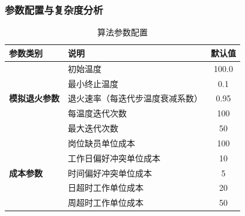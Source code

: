 \subsubsection{参数配置与复杂度分析}
\begin{table}[H]
    \centering
    \caption{算法参数配置}
    \label{tab:sa_params}
    \begin{tabularx}{\linewidth}{|l|X|c|}
    \hline
    \textbf{参数类别} & \textbf{说明} & \textbf{默认值} \\ \hline
    
    \multirow{5}{*}{\textbf{模拟退火参数}} 
        & 初始温度 & 100.0 \\ \cline{2-3}
        & 最小终止温度 & 0.1 \\ \cline{2-3}
        & 退火速率（每迭代步温度衰减系数） & 0.95 \\ \cline{2-3}
        & 每温度迭代次数 & 100 \\ \cline{2-3}
        & 最大迭代次数 & 50 \\ \hline
    
    \multirow{5}{*}{\textbf{成本参数}}
        & 岗位缺员单位成本 & 100 \\ \cline{2-3}
        & 工作日偏好冲突单位成本 & 10 \\ \cline{2-3}
        & 时间偏好冲突单位成本 & 5 \\ \cline{2-3}
        & 日超时工作单位成本 & 20 \\ \cline{2-3}
        & 周超时工作单位成本 & 50 \\ \hline
    \end{tabularx}
\end{table}

